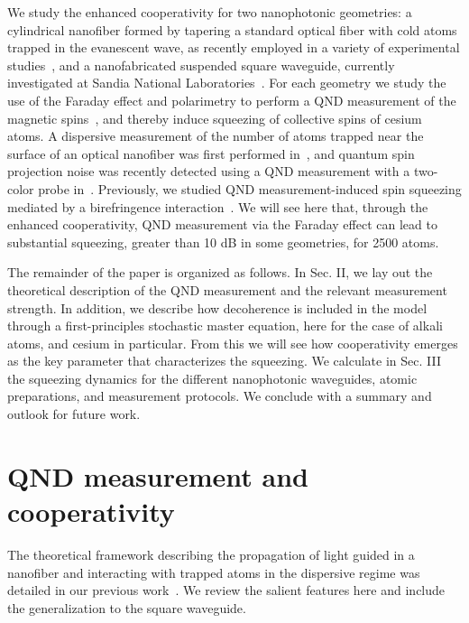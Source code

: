 \documentclass[aps,pra,twocolumn,superscriptaddress]{revtex4-1} %
\begin{document}
We study the enhanced cooperativity for two nanophotonic geometries: a cylindrical nanofiber formed by tapering a standard optical fiber with cold atoms trapped in the evanescent wave, as recently employed in a variety of experimental studies~\cite{Vetsch2010Optical, Goban2012, Reitz2013, Lee2015, Goban2014, Reitz2014, Volz2014Nonlinear, Beguin2014, Mitsch2014,Kato2015Strong, Sayrin2015, Sayrin2015a, Mitsch2014a, Solano2017Dynamics, Beguin2017Observation}, and a nanofabricated suspended square waveguide, currently investigated at Sandia National Laboratories~\cite{Lee2017Characterizations}.  For each geometry we study the use of the Faraday effect and polarimetry to perform a QND measurement of the magnetic spins~\cite{Smith2003a}, and thereby induce squeezing of collective spins of cesium atoms.  A dispersive measurement of the number of atoms trapped near the surface of an optical nanofiber was first performed in~\cite{Dawkins2011}, and quantum spin projection noise was recently detected using a QND measurement with a two-color probe in~\cite{Beguin2014, Beguin2017Observation}.  Previously, we studied QND measurement-induced spin squeezing  mediated by a birefringence interaction~\cite{Qi2016}. We will see here that, through the enhanced cooperativity, QND measurement via the Faraday effect can lead to substantial squeezing, greater than 10 dB in some geometries, for 2500 atoms.

The remainder of the paper is organized as follows.  In Sec. II, we lay out the theoretical description of the QND measurement and the relevant measurement strength.  In addition, we describe how decoherence is included in the model through a first-principles stochastic master equation, here for the case of alkali atoms, and cesium in particular.  From this we will see how cooperativity emerges as the key parameter that characterizes the squeezing.  We calculate in Sec. III the squeezing dynamics for the different nanophotonic waveguides, atomic preparations, and measurement protocols.  We conclude with a summary and outlook for future work.


\section{QND measurement and cooperativity} \label{Sec::QNDandCooperativityTheory}
The theoretical framework describing the propagation of light guided in a nanofiber and interacting with trapped atoms in the dispersive regime was detailed in our previous work~\cite{Qi2016}.  We review the salient features here and include the generalization to the square waveguide.
\end{document}
